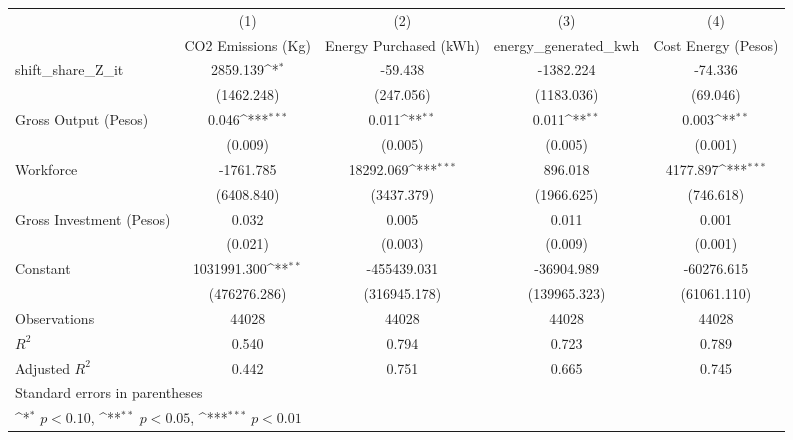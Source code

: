 {
\def\sym#1{\ifmmode^{#1}\else\(^{#1}\)\fi}
\begin{tabular}{l*{4}{c}}
\hline\hline
                &\multicolumn{1}{c}{(1)}&\multicolumn{1}{c}{(2)}&\multicolumn{1}{c}{(3)}&\multicolumn{1}{c}{(4)}\\
                &\multicolumn{1}{c}{CO2 Emissions (Kg)}&\multicolumn{1}{c}{Energy Purchased (kWh)}&\multicolumn{1}{c}{energy\_generated\_kwh}&\multicolumn{1}{c}{Cost Energy (Pesos)}\\
\hline
shift\_share\_Z\_it& 2859.139\sym{*}  &  -59.438         &-1382.224         &  -74.336         \\
                &(1462.248)         &(247.056)         &(1183.036)         & (69.046)         \\
[1em]
Gross Output (Pesos)&    0.046\sym{***}&    0.011\sym{**} &    0.011\sym{**} &    0.003\sym{**} \\
                &  (0.009)         &  (0.005)         &  (0.005)         &  (0.001)         \\
[1em]
Workforce       &-1761.785         &18292.069\sym{***}&  896.018         & 4177.897\sym{***}\\
                &(6408.840)         &(3437.379)         &(1966.625)         &(746.618)         \\
[1em]
Gross Investment (Pesos)&    0.032         &    0.005         &    0.011         &    0.001         \\
                &  (0.021)         &  (0.003)         &  (0.009)         &  (0.001)         \\
[1em]
Constant        &1031991.300\sym{**} &-455439.031         &-36904.989         &-60276.615         \\
                &(476276.286)         &(316945.178)         &(139965.323)         &(61061.110)         \\
\hline
Observations    &    44028         &    44028         &    44028         &    44028         \\
\(R^{2}\)       &    0.540         &    0.794         &    0.723         &    0.789         \\
Adjusted \(R^{2}\)&    0.442         &    0.751         &    0.665         &    0.745         \\
\hline\hline
\multicolumn{5}{l}{\footnotesize Standard errors in parentheses}\\
\multicolumn{5}{l}{\footnotesize \sym{*} \(p<0.10\), \sym{**} \(p<0.05\), \sym{***} \(p<0.01\)}\\
\end{tabular}
}

